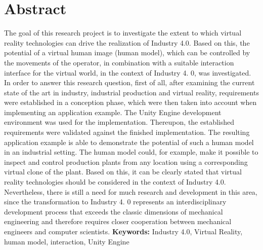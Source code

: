 \chapter*{Abstract}\label{sec:Abstract}
The goal of this research project is to investigate the extent to which virtual reality technologies can drive the realization of Industry 4.0. Based on this, the potential of a virtual human image (human model), which can be controlled by the movements of the operator, in combination with a suitable interaction interface for the virtual world, in the context of Industry 4. 0, was investigated.
In order to answer this research question, first of all, after examining the current state of the art in industry, industrial production and virtual reality, requirements were established in a conception phase, which were then taken into account when implementing an application example. The Unity Engine development environment was used for the implementation. Thereupon, the established requirements were validated against the finished implementation.
The resulting application example is able to demonstrate the potential of such a human model in an industrial setting. The human model could, for example, make it possible to inspect and control production plants from any location using a corresponding virtual clone of the plant.
Based on this, it can be clearly stated that virtual reality technologies should be considered in the context of Industry 4.0. Nevertheless, there is still a need for much research and development in this area, since the transformation to Industry 4. 0 represents an interdisciplinary development process that exceeds the classic dimensions of mechanical engineering and therefore requires closer cooperation between mechanical engineers and computer scientists.
\newline
\textbf{Keywords:} Industry 4.0, Virtual Reality, human model, interaction, Unity Engine

\endgroup